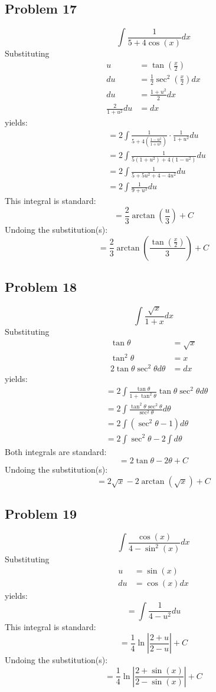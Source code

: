 \documentclass{article}
\begin{document}
\subsection*{Problem 17}
$$\int\frac{1}{5+4\cos\left(x\right)}dx$$
Substituting
\begin{align*}
u&=\tan\left(\frac{x}{2}\right) \\
du&=\frac{1}{2}\sec^2\left(\frac{x}{2}\right)dx \\
du&=\frac{1+u^2}{2}dx \\
\frac{2}{1+u^2}du&=dx
\end{align*}
yields:
\begin{align*}
&=2\int\frac{1}{5+4\left(\frac{1-u^2}{1+u^2}\right)}\cdot\frac{1}{1+u^2}du \\
&=2\int\frac{1}{5(1+u^2)+4(1-u^2)}du \\
&=2\int\frac{1}{5+5u^2+4-4u^2}du \\
&=2\int\frac{1}{9+u^2}du
\end{align*}
This integral is standard:
$$=\frac{2}{3}\arctan\left(\frac{u}{3}\right)+C$$
Undoing the substitution(s):
$$=\frac{2}{3}\arctan\left(\frac{\tan(\frac{x}{2})}{3}\right)+C$$
\subsection*{Problem 18}
$$\int\frac{\sqrt{x}}{1+x}dx$$
Substituting
\begin{align*}
\tan\theta&=\sqrt{x} \\
\tan^2\theta&=x \\
2\tan\theta\sec^2\theta d\theta&=dx
\end{align*}
yields:
\begin{align*}
&=2\int\frac{\tan\theta}{1+\tan^2\theta}\tan\theta\sec^2\theta d\theta \\
&=2\int\frac{\tan^2\theta\sec^2\theta}{\sec^2\theta}d\theta \\
&=2\int\left(\sec^2\theta-1\right)d\theta \\
&=2\int\sec^2\theta-2\int d\theta
\end{align*}
Both integrals are standard:
$$=2\tan\theta-2\theta+C$$
Undoing the substitution(s):
$$=2\sqrt{x}-2\arctan\left(\sqrt{x}\right)+C$$
\subsection*{Problem 19}
$$\int\frac{\cos\left(x\right)}{4-\sin^2\left(x\right)}dx$$
Substituting
\begin{align*}
u&=\sin(x) \\
du&=\cos(x)dx
\end{align*}
yields:
$$=\int\frac{1}{4-u^2}du$$
This integral is standard:
$$=\frac{1}{4}\ln\left|\frac{2+u}{2-u}\right|+C$$
Undoing the substitution(s):
$$=\frac{1}{4}\ln\left|\frac{2+\sin(x)}{2-\sin(x)}\right|+C$$
\end{document}
